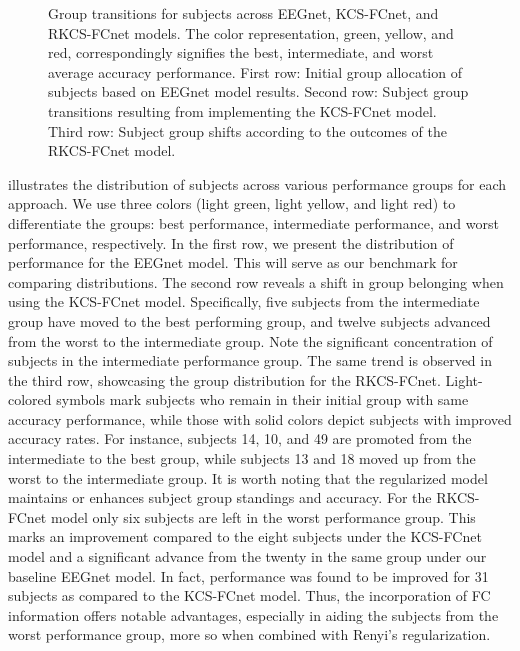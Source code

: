 \begin{figure}[!h]
  \centering
  \resizebox{\linewidth}{!}{}
  \caption{Group transitions for subjects across EEGnet, KCS-FCnet, and RKCS-FCnet models. The color representation, green, yellow, and red, correspondingly signifies the best, intermediate, and worst average accuracy performance. First row: Initial group allocation of subjects based on EEGnet model results. Second row: Subject group transitions resulting from implementing the KCS-FCnet model. Third row: Subject group shifts according to the outcomes of the RKCS-FCnet model.}\label{fig:belongcomp_obj3}
\end{figure}

 illustrates the distribution of subjects across various performance groups for each approach. We use three colors (light green, light yellow, and light red) to differentiate the groups: best performance, intermediate performance, and worst performance, respectively. In the first row, we present the distribution of performance for the EEGnet model. This will serve as our benchmark for comparing distributions. The second row reveals a shift in group belonging when using the KCS-FCnet model. Specifically, five subjects from the intermediate group have moved to the best performing group, and twelve subjects advanced from the worst to the intermediate group. Note the significant concentration of subjects in the intermediate performance group. The same trend is observed in the third row, showcasing the group distribution for the RKCS-FCnet. Light-colored symbols mark subjects who remain in their initial group with same accuracy performance, while those with solid colors depict subjects with improved accuracy rates. For instance, subjects 14, 10, and 49 are promoted from the intermediate to the best group, while subjects 13 and 18 moved up from the worst to the intermediate group. It is worth noting that the regularized model maintains or enhances subject group standings and accuracy. For the RKCS-FCnet model only six subjects are left in the worst performance group. This marks an improvement compared to the eight subjects under the KCS-FCnet model and a significant advance from the twenty in the same group under our baseline EEGnet model. In fact, performance was found to be improved for 31 subjects as compared to the KCS-FCnet model. Thus, the incorporation of FC information offers notable advantages, especially in aiding the subjects from the worst performance group, more so when combined with Renyi's regularization.

